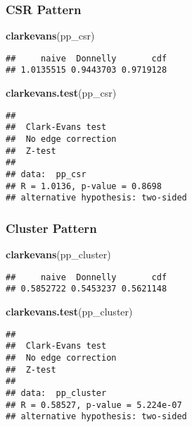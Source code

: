 \documentclass[
]{book}
\newenvironment{Shaded}{\begin{snugshade}}{\end{snugshade}}
\newcommand{\KeywordTok}[1]{\textcolor[rgb]{0.13,0.29,0.53}{\textbf{#1}}}
\newcommand{\NormalTok}[1]{#1}
\begin{document}
\hypertarget{csr-pattern-2}{%
\subsubsection{CSR Pattern}\label{csr-pattern-2}}

\begin{Shaded}
\begin{Highlighting}[]
\KeywordTok{clarkevans}\NormalTok{(pp_csr)}
\end{Highlighting}
\end{Shaded}

\begin{verbatim}
##     naive  Donnelly       cdf 
## 1.0135515 0.9443703 0.9719128
\end{verbatim}

\begin{Shaded}
\begin{Highlighting}[]
\KeywordTok{clarkevans.test}\NormalTok{(pp_csr)}
\end{Highlighting}
\end{Shaded}

\begin{verbatim}
## 
## 	Clark-Evans test
## 	No edge correction
## 	Z-test
## 
## data:  pp_csr
## R = 1.0136, p-value = 0.8698
## alternative hypothesis: two-sided
\end{verbatim}

\hypertarget{cluster-pattern-2}{%
\subsubsection{Cluster Pattern}\label{cluster-pattern-2}}

\begin{Shaded}
\begin{Highlighting}[]
\KeywordTok{clarkevans}\NormalTok{(pp_cluster)}
\end{Highlighting}
\end{Shaded}

\begin{verbatim}
##     naive  Donnelly       cdf 
## 0.5852722 0.5453237 0.5621148
\end{verbatim}

\begin{Shaded}
\begin{Highlighting}[]
\KeywordTok{clarkevans.test}\NormalTok{(pp_cluster)}
\end{Highlighting}
\end{Shaded}

\begin{verbatim}
## 
## 	Clark-Evans test
## 	No edge correction
## 	Z-test
## 
## data:  pp_cluster
## R = 0.58527, p-value = 5.224e-07
## alternative hypothesis: two-sided
\end{verbatim}
\end{document}
